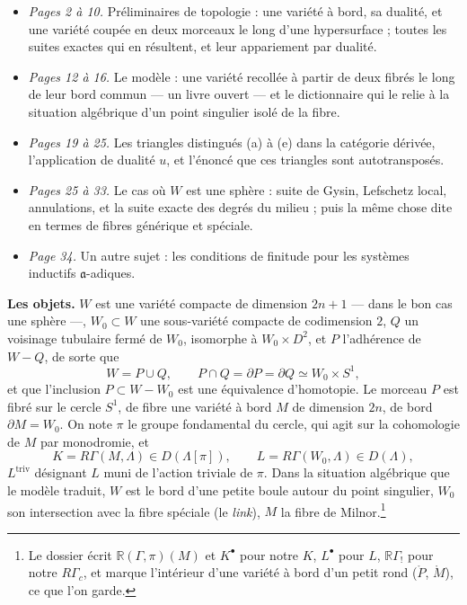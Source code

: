 \documentclass[11pt,a4paper]{article}
\begin{document}
\begin{itemize}
\item \emph{Pages 2 à 10.} Préliminaires de topologie : une variété à bord, sa
  dualité, et une variété coupée en deux morceaux le long d'une hypersurface ;
  toutes les suites exactes qui en résultent, et leur appariement par dualité.
\item \emph{Pages 12 à 16.} Le modèle : une variété recollée à partir de deux
  fibrés le long de leur bord commun — un livre ouvert — et le dictionnaire qui
  le relie à la situation algébrique d'un point singulier isolé de la fibre.
\item \emph{Pages 19 à 25.} Les triangles distingués (a) à (e) dans la
  catégorie dérivée, l'application de dualité $u$, et l'énoncé que ces
  triangles sont autotransposés.
\item \emph{Pages 25 à 33.} Le cas où $W$ est une sphère : suite de Gysin,
  Lefschetz local, annulations, et la suite exacte des degrés du milieu ; puis
  la même chose dite en termes de fibres générique et spéciale.
\item \emph{Page 34.} Un autre sujet : les conditions de finitude pour les
  systèmes inductifs $\mathfrak{a}$-adiques.
\end{itemize}

\textbf{Les objets.} $W$ est une variété compacte de dimension $2n+1$ — dans
le bon cas une sphère —, $W_0 \subset W$ une sous-variété compacte de
codimension $2$, $Q$ un voisinage tubulaire fermé de $W_0$, isomorphe à
$W_0 \times D^{2}$, et $P$ l'adhérence de $W - Q$, de sorte que
\[
  W = P \cup Q, \qquad P \cap Q = \partial P = \partial Q \simeq W_0 \times S^{1},
\]
et que l'inclusion $P \subset W - W_0$ est une équivalence d'homotopie. Le
morceau $P$ est fibré sur le cercle $S^{1}$, de fibre une variété à bord $M$
de dimension $2n$, de bord $\partial M = W_0$. On note $\pi$ le groupe
fondamental du cercle, qui agit sur la cohomologie de $M$ par monodromie, et
\[
  K = R\Gamma(M, \Lambda) \in D(\Lambda[\pi]), \qquad
  L = R\Gamma(W_0, \Lambda) \in D(\Lambda),
\]
$L^{\mathrm{triv}}$ désignant $L$ muni de l'action triviale de $\pi$. Dans la
situation algébrique que le modèle traduit, $W$ est le bord d'une petite boule
autour du point singulier, $W_0$ son intersection avec la fibre spéciale (le
\emph{link}), $M$ la fibre de Milnor.\footnote{Le dossier écrit
$\mathbb{R}(\Gamma, \pi)(M)$ et $K^{\bullet}$ pour notre $K$, $L^{\bullet}$
pour $L$, $\mathbb{R}\Gamma_{!}$ pour notre $R\Gamma_{c}$, et marque
l'intérieur d'une variété à bord d'un petit rond ($\mathring{P}$,
$\mathring{M}$), ce que l'on garde.}
\end{document}
